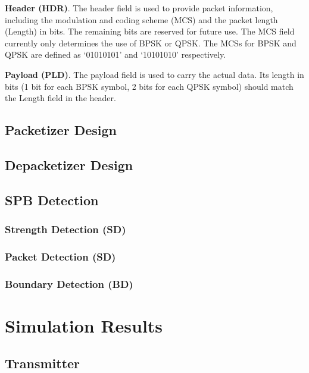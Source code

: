 \documentclass[journal,twoside]{IEEEtran}
\begin{document}
    \textbf{Header (HDR)}.
    The header field is used to provide packet information,
    including the modulation and coding scheme (MCS) and the packet length (Length) in bits.
    The remaining bits are reserved for future use.
    The MCS field currently only determines the use of BPSK or QPSK.
    The MCSs for BPSK and QPSK are defined as `01010101' and `10101010' respectively.

    \textbf{Payload (PLD)}.
    The payload field is used to carry the actual data.
    Its length in bits (1 bit for each BPSK symbol, 2 bits for each QPSK symbol) should match the Length field in the header.

    \subsection{Packetizer Design}

    \subsection{Depacketizer Design}

    \subsection{SPB Detection}

      \subsubsection{Strength Detection (SD)}

      \subsubsection{Packet Detection (SD)}

      \subsubsection{Boundary Detection (BD)}

  \section{Simulation Results}

    \subsection{Transmitter}
\end{document}
